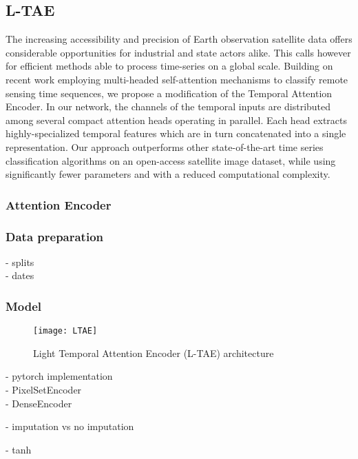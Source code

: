 \subsection{L-TAE}
The increasing accessibility and precision of Earth observation satellite data offers considerable opportunities for industrial and state actors alike. This calls however for efficient methods able to process time-series on a global scale. Building on recent work employing multi-headed self-attention mechanisms to classify remote sensing time sequences, we propose a modification of the Temporal Attention Encoder. In our network, the channels of the temporal inputs are distributed among several compact attention heads operating in parallel. Each head extracts highly-specialized temporal features which are in turn concatenated into a single representation. Our approach outperforms other state-of-the-art time series classification algorithms on an open-access satellite image dataset, while using significantly fewer parameters and with a reduced computational complexity.

\subsubsection{Attention Encoder}

\subsubsection{Data preparation}
- splits\\
- dates\\

\subsubsection{Model}

\begin{figure}[!htbp]
  \centering
  \texttt{[image: LTAE]}
  \caption{Light Temporal Attention Encoder  (L-TAE) architecture \cite{LTAE}}
  \label{tab:LTAErchitecture}
\end{figure}

- pytorch implementation\\
- PixelSetEncoder\\
- DenseEncoder

- imputation vs no imputation

- tanh

